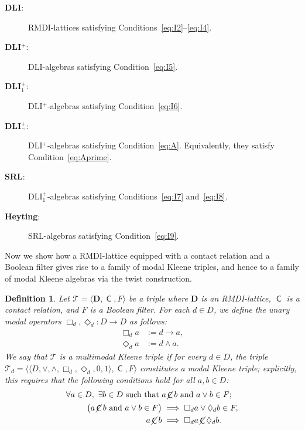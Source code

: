 \documentclass{article}
\newtheorem{definition}[theorem]{Definition}
\DeclareMathOperator{\con}{\mathsf{C}}
\DeclareMathOperator{\notcon}{\cancel{ \con}}
\newcommand{\D}{\mathbf{D}}
\begin{document}
\begin{description}
\item[\textbf{DLI}:] RMDI-lattices satisfying
Conditions~\eqref{eq:I2}--\eqref{eq:I4}.

\item[\textbf{DLI$^{+}$}:] DLI-algebras satisfying
Condition~\eqref{eq:I5}.

\item[\textbf{DLI$^{+}_{1}$}:] DLI$^{+}$-algebras satisfying
Condition~\eqref{eq:I6}.

\item[\textbf{DLI$^{+}_{\neg}$}:] DLI$^{+}$-algebras satisfying
Condition~\eqref{eq:A}. Equivalently, they satisfy
Condition~\eqref{eq:Aprime}.

\item[\textbf{SRL}:] DLI$^{+}_{1}$-algebras satisfying
Conditions~\eqref{eq:I7} and~\eqref{eq:I8}.

\item[\textbf{Heyting}:] SRL-algebras satisfying
Condition~\eqref{eq:I9}.
\end{description}

Now we show how a RMDI-lattice equipped with a contact relation and a Boolean filter gives rise to a family of modal Kleene triples, and hence to a family of modal Kleene algebras via the twist construction.

\begin{definition}
Let $\mathcal{T}=\langle \D, \con, F\rangle$ be a triple where $\D$ is an RMDI-lattice, $\con$ is a contact relation, and $F$ is a Boolean filter. For each $d \in D$, we define the unary modal operators $\Box_d, \Diamond_d: D \to D$ as follows:
\begin{align*}
    \Box_d a &:= d \to a, \\
    \Diamond_d a &:= d \wedge a.
\end{align*}
We say that $\mathcal{T}$ is a \emph{multimodal Kleene triple} if for every $d \in D$, the triple $\mathcal{T}_d=\langle\langle D,\vee,\wedge, \Box_d, \Diamond_d,0,1\rangle, \con, F\rangle$ constitutes a modal Kleene triple; explicitly, this requires that the following conditions hold for all $a, b\in D$:
\begin{align}
\forall a \in D,\ \exists b \in D \text{ such that }& a\notcon b \text{ and } a \vee b \in F;\\
    \big(a\notcon b \text{ and } a \vee b \in F\big) &\implies \Box_d a \vee \Diamond_d b \in F, \label{cond:filter2} \\
    a\notcon b &\implies \Box_d a \notcon \Diamond_d b. \label{ax:modal-contact2}
\end{align}
\end{definition}
\end{document}
